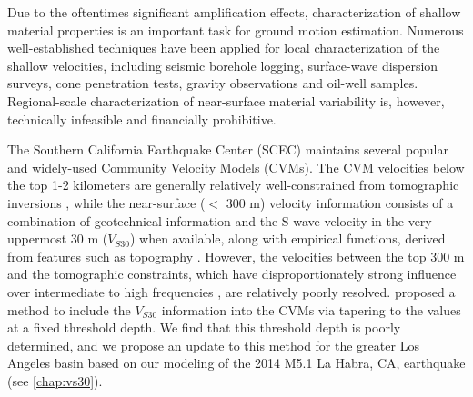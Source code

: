Due to the oftentimes significant amplification effects, characterization of shallow material properties is an important task for ground motion estimation. Numerous well-established techniques have been applied for local characterization of the shallow velocities, including seismic borehole logging, surface-wave dispersion surveys, cone penetration tests, gravity observations and oil-well samples. Regional-scale characterization of near-surface material variability is, however, technically infeasible and financially prohibitive. 

The Southern California Earthquake Center (SCEC) maintains several popular and widely-used Community Velocity Models (CVMs). The CVM velocities below the top 1-2 kilometers are generally relatively well-constrained from tomographic inversions , while the near-surface ($<$ 300 m) velocity information consists of a combination of geotechnical information and the S-wave velocity in the very uppermost 30 m ($V_{S30}$) when available, along with empirical functions, derived from features such as topography . However, the velocities between the top 300 m and the tomographic constraints, which have disproportionately strong influence over intermediate to high frequencies \citep[e.g. $>$ 0.5 Hz][]{dayRMSResponseOnedimensional1996}, are relatively poorly resolved. \citet{elyVs30derivedNearsurfaceSeismic2010} proposed a method to include the $V_{S30}$ information into the CVMs via tapering to the values at a fixed threshold depth. We find that this threshold depth is poorly determined, and we propose an update to this method for the greater Los Angeles basin based on our modeling of the 2014 M5.1 La Habra, CA, earthquake (see \cref{chap:vs30}). 



